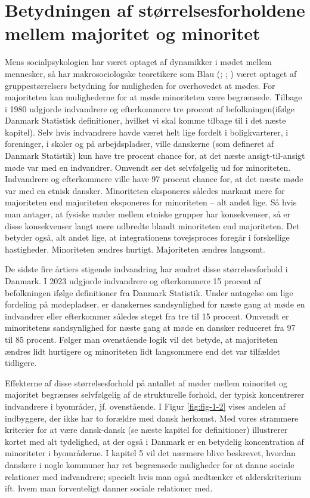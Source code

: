 \documentclass[
]{book}
\begin{document}
\section{Betydningen af størrelsesforholdene mellem majoritet og minoritet}\label{betydningen-af-stuxf8rrelsesforholdene-mellem-majoritet-og-minoritet}

Mens socialpsykologien har været optaget af dynamikker i mødet mellem mennesker, så har makrosociologske teoretikere som Blau (; ; ) været optaget af gruppestørrelsers betydning for muligheden for overhovedet at mødes. For majoriteten kan mulighederne for at møde minoriteten være begrænsede. Tilbage i 1980 udgjorde indvandrere og efterkommere tre procent af befolkningen(ifølge Danmark Statistisk definitioner, hvilket vi skal komme tilbage til i det næste kapitel). Selv hvis indvandrere havde været helt lige fordelt i boligkvarterer, i foreninger, i skoler og på arbejdspladser, ville danskerne (som defineret af Danmark Statistik) kun have tre procent chance for, at det næste ansigt-til-ansigt møde var med en indvandrer. Omvendt ser det selvfølgelig ud for minoriteten. Indvandrere og efterkommere ville have 97 procent chance for, at det næste møde var med en etnisk dansker. Minoriteten eksponeres således markant mere for majoriteten end majoriteten eksponeres for minoriteten -- alt andet lige. Så hvis man antager, at fysiske møder mellem etniske grupper har konsekvenser, så er disse konsekvenser langt mere udbredte blandt minoriteten end majoriteten. Det betyder også, alt andet lige, at integrationens tovejsproces foregår i forskellige hastigheder. Minoriteten ændres hurtigt. Majoriteten ændres langsomt.

De sidste fire årtiers stigende indvandring har ændret disse størrelsesforhold i Danmark. I 2023 udgjorde indvandrere og efterkommere 15 procent af befolkningen ifølge definitioner fra Danmark Statistik. Under antagelse om lige fordeling på mødepladser, er danskernes sandsynlighed for næste gang at møde en indvandrer eller efterkommer således steget fra tre til 15 procent. Omvendt er minoritetens sandsynlighed for næste gang at møde en dansker reduceret fra 97 til 85 procent. Følger man ovenstående logik vil det betyde, at majoriteten ændres lidt hurtigere og minoriteten lidt langsommere end det var tilfældet tidligere.

Effekterne af disse størrelsesforhold på antallet af møder mellem minoritet og majoritet begrænses selvfølgelig af de strukturelle forhold, der typisk koncentrerer indvandrere i byområder, jf. ovenstående. I Figur \ref{fig:fig-1-2} vises andelen af indbyggere, der ikke har to forældre med dansk herkomst. Med vores strammere kriterier for at være dansk-dansk (se næste kapitel for definitioner) illustrerer kortet med alt tydelighed, at der også i Danmark er en betydelig koncentration af minoriteter i byområderne. I kapitel 5 vil det nærmere blive beskrevet, hvordan danskere i nogle kommuner har ret begrænsede muligheder for at danne sociale relationer med indvandrere; specielt hvis man også medtænker et alderskriterium ift. hvem man forventeligt danner sociale relationer med.
\end{document}

